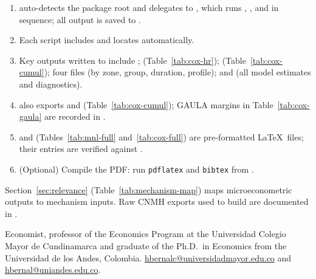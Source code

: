 \documentclass[ecta,nameyear,final,supplement]{econsocart}
\numberwithin{equation}{section}
\numberwithin{table}{section}
\begin{document}
\begin{sloppypar}
\begin{enumerate}
\item {} auto-detects the package root and delegates to
  , which runs ,
  , and 
  in sequence; all output is saved to .
\item Each script includes  and locates
   automatically.
\item Key outputs written to  include
  ; 
  (Table~\ref{tab:cox-hr}); 
  (Table~\ref{tab:cox-cumul}); four  files
  (by zone, group, duration, profile); and 
  (all model estimates and diagnostics).
\item {} also exports
   and 
  (Table~\ref{tab:cox-cumul}); GAULA margins in Table~\ref{tab:cox-gaula}
  are recorded in .
\item {} and 
  (Tables~\ref{tab:mnl-full} and~\ref{tab:cox-full}) are pre-formatted
  \LaTeX\ files; their entries are verified against .
\item (Optional) Compile the PDF: run \texttt{pdflatex} and \texttt{bibtex}
  from .
\end{enumerate}
\end{sloppypar}

\begin{sloppypar}
Section~\ref{sec:relevance} (Table~\ref{tab:mechanism-map}) maps
microeconometric outputs to mechanism inputs. Raw CNMH exports used to build
 are documented in .
\end{sloppypar}




\begin{funding}
Economist, professor of the Economics Program at the Universidad Colegio
Mayor de Cundinamarca and graduate of the Ph.D.\ in Economics from the
Universidad de los Andes, Colombia.
\href{mailto:hbernalc@universidadmayor.edu.co}{hbernalc@universidadmayor.edu.co}
and \href{mailto:hbernal@uniandes.edu.co}{hbernal@uniandes.edu.co}.
\end{funding}
\end{document}

